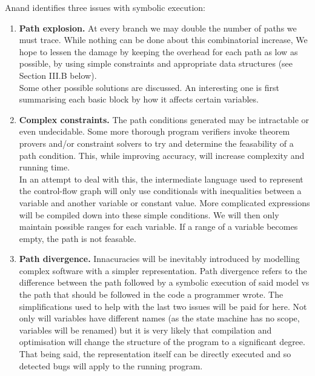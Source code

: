 \documentclass[12pt,a4paper]{article}
\begin{document}
\noindent
Anand \cite[pp.~2--3]{anand} identifies three issues with symbolic execution:\\
\begin{enumerate}
\item \textbf{Path explosion.} At every branch we may double the number of paths we must trace. While
nothing can be done about this combinatorial increase, We hope to lessen the damage by keeping the overhead
for each path as low as possible, by using simple constraints and appropriate data structures (see Section III.B below).\\ %
Some other possible solutions are discussed. An interesting one is first summarising each basic block by how it affects certain variables.\\

\item \textbf{Complex constraints.} The path conditions generated may be intractable or even undecidable. Some more thorough program verifiers \citep{zhang, gupta}
invoke theorem provers and/or constraint solvers to try and determine the feasability of a path condition. This, while improving accuracy, will increase complexity
and running time.\\
In an attempt to deal with this, the intermediate language used to represent the control-flow graph will only
use conditionals with inequalities between a variable and another variable or constant value. More complicated expressions
will be compiled down into these simple conditions. We will then only maintain possible ranges for each variable. If a range of
a variable becomes empty, the path is not feasable.\\

\item \textbf{Path divergence.} Innacuracies will be inevitably introduced by modelling complex software with a simpler representation. Path divergence refers to the difference between the path followed by a symbolic execution of said model vs the path that
should be followed in the code a programmer wrote. The simplifications used to help with the last two issues will be paid for here. Not only will variables have different names (as the state machine has no scope, variables will be renamed) but it is very
likely that compilation and optimisation will change the structure of the program to a significant degree. That being said, the representation
itself can be directly executed and so detected bugs will apply to the running program.
\end{enumerate}
\end{document}
